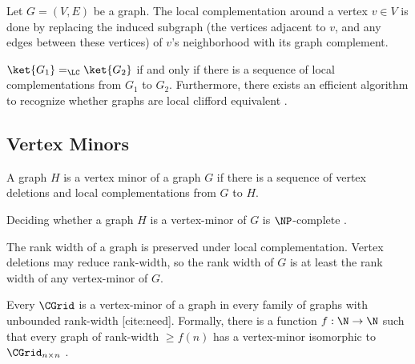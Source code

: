 \begin{definition}
Let $G = (V,E)$ be a graph. The local complementation around a vertex $v \in V$ is done by replacing the induced subgraph (the vertices adjacent to $v$, and any edges between these vertices) of $v$'s neighborhood with its graph complement.
\end{definition}

\begin{theorem}
$\ket{G_1} =_\LC \ket{G_2}$ if and only if there is a sequence of local complementations from $G_1$ to $G_2$. Furthermore, there exists an efficient algorithm to recognize whether graphs are local clifford equivalent \cite{lc-equiv-alg}.
\end{theorem}

\subsection{Vertex Minors}

\begin{definition}
A graph $H$ is a vertex minor of a graph $G$ if there is a sequence of vertex deletions and local complementations from $G$ to $H$.
\end{definition}


\begin{theorem}
Deciding whether a graph $H$ is a vertex-minor of $G$ is $\NP$-complete \cite{vertex-minor-np}.
\end{theorem}

\begin{definition}
\end{definition}

\begin{fact}
The rank width of a graph is preserved under local complementation. Vertex deletions may reduce rank-width, so the rank width of $G$ is at least the rank width of any vertex-minor of $G$.
\end{fact}

\begin{theorem}
Every $\CGrid$ is a vertex-minor of a graph in every family of graphs with unbounded rank-width [cite:need]. Formally, there is a function $f: \N \to \N$ such that every graph of rank-width $\geq f(n)$ has a vertex-minor isomorphic to $\CGrid_{n \times n}$ \cite{grid-theorem}.
\end{theorem}

